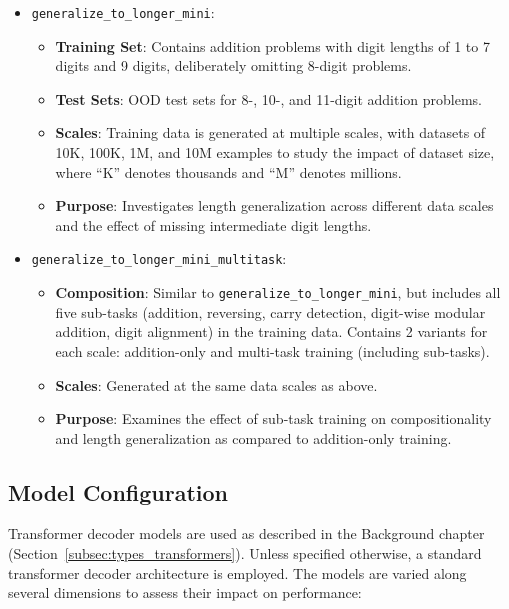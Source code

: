 \begin{itemize}
    \item \texttt{generalize\_to\_longer\_mini}:
          \begin{itemize}
              \item \textbf{Training Set}: Contains addition problems with digit lengths of 1 to 7 digits and 9 digits, deliberately omitting 8-digit problems.
              \item \textbf{Test Sets}: OOD test sets for 8-, 10-, and 11-digit addition problems.
              \item \textbf{Scales}: Training data is generated at multiple scales, with datasets of 10K, 100K, 1M, and 10M examples to study the impact of dataset size, where ``K'' denotes thousands and ``M'' denotes millions.
              \item \textbf{Purpose}: Investigates length generalization across different data scales and the effect of missing intermediate digit lengths.
          \end{itemize}

    \item \texttt{generalize\_to\_longer\_mini\_multitask}:
          \begin{itemize}
              \item \textbf{Composition}: Similar to \texttt{generalize\_to\_longer\_mini}, but includes all five sub-tasks (addition, reversing, carry detection, digit-wise modular addition, digit alignment) in the training data. Contains 2 variants for each scale: addition-only and multi-task training (including sub-tasks).
              \item \textbf{Scales}: Generated at the same data scales as above.
              \item \textbf{Purpose}: Examines the effect of sub-task training on compositionality and length generalization as compared to addition-only training.
          \end{itemize}
\end{itemize}

\subsection{Model Configuration}

Transformer decoder models are used as described in the Background chapter (Section~\ref{subsec:types_transformers}). Unless specified otherwise, a standard transformer decoder architecture is employed. The models are varied along several dimensions to assess their impact on performance:


